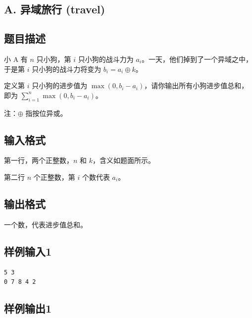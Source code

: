 
\begin{center}
    \section{A. 异域旅行 (travel)}
\end{center}

\subsection{题目描述}

小 A 有 $n$ 只小狗，第 $i$ 只小狗的战斗力为 $a_i$。一天，他们掉到了一个异域之中，于是第 $i$ 只小狗的战斗力将变为 $b_i = a_i \oplus k$。

定义第 $i$ 只小狗的进步值为 $\max(0,b_i-a_i)$，请你输出所有小狗进步值总和，即为 $\sum_{i=1}^{n} \max(0,b_i-a_i)$。

注：$\oplus$ 指按位异或。

\subsection{输入格式}

第一行，两个正整数，$n$ 和 $k$，含义如题面所示。

第二行 $n$ 个正整数，第 $i$ 个数代表 $a_i$。

\subsection{输出格式}

一个数，代表进步值总和。

\subsection{样例输入1}

\begin{lstlisting}
5 3
0 7 8 4 2
\end{lstlisting}

\subsection{样例输出1}

